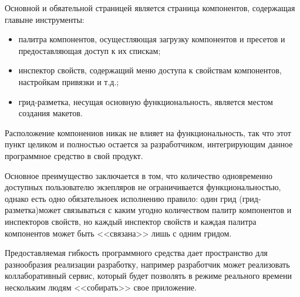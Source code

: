 Основной и обяательной страницей является страница компонентов, содержащая главыне инструменты:

\begin{itemize}
    \item палитра компонентов, осущестляющая загрузку компонентов и пресетов и предоставляющая доступ к их спискам;
    \item инспектор свойств, содержащий меню доступа к свойствам компонентов, настройкам привязки и т.д.;
    \item грид-разметка, несущая основную функциональность, является местом создания макетов.
\end{itemize}

Расположение компонениов никак не влияет на функциональность, так что этот пункт целиком и полностью остается за разработчиком, интегрирующим данное программное средство в свой продукт.

Основное преимущество заключается в том, что количество одновременно доступных пользователю экзепляров не ограничивается функциональностью, однако есть одно обязательноек исполнению правило: один грид (грид-разметка)может связываться с каким угодно количеством палитр компонентов и инспекторов свойств, но каждый инспектор свойств и каждая палитра компонентов может быть <<связана>> лишь с одним гридом.

Предоставляемая гибкость программного средства дает пространство для разнообразия реализации разработку, например разработчик может реализовать коллаборативный сервис, который будет позволять в режиме реального времени нескольким людям <<собирать>> свое приложение.